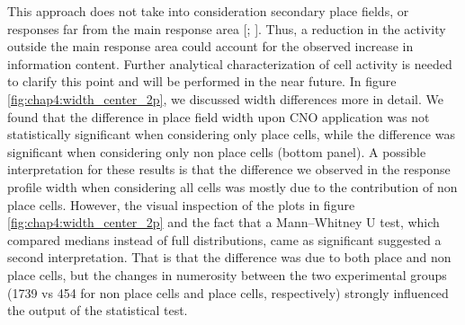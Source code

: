 This approach does not take into consideration secondary place fields, or responses far from the main response area [\cite{danielson2016sublayer}; \cite{zaremba2017impaired}]. 
Thus, a reduction in the activity outside the main response area could account for the observed increase in information content. 
Further analytical characterization of cell activity is needed to clarify this point and will be performed in the near future. 
In figure \ref{fig:chap4:width_center_2p}, we discussed width differences more in detail.
We found that the difference in place field width upon CNO application was not statistically significant when considering only place cells, while the difference was significant when considering only non place cells (bottom panel). 
A possible interpretation for these results is that the difference we observed in the response profile width when considering all cells was mostly due to the contribution of non place cells. 
However, the visual inspection of the plots in figure \ref{fig:chap4:width_center_2p} and the fact that a Mann–Whitney U test, which compared medians instead of full distributions, came as significant suggested a second interpretation. 
That is that the difference was due to both place and non place cells, but the changes in numerosity between the two experimental groups (1739 vs 454 for non place cells and place cells, respectively) strongly influenced the output of the statistical test.

